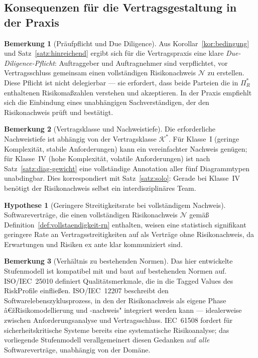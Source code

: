 ﻿\documentclass[a4paper,12pt]{article}
\theoremstyle{definition}
\newtheorem{bemerkung}{Bemerkung}
\newtheorem{hypothese}{Hypothese}
\begin{document}
\subsection{Konsequenzen f\"ur die Vertragsgestaltung in der Praxis}

\begin{bemerkung}[Pr\"aufpflicht und Due Diligence]
    Aus Korollar~\ref{kor:bedingung} und Satz~\ref{satz:hinreichend} ergibt sich f\"ur
    die Vertragspraxis eine klare \emph{Due-Diligence-Pflicht}: Auftraggeber und
    Auftragnehmer sind verpflichtet, vor Vertragsschluss gemeinsam einen vollst\"andigen
    Risikonachweis $\mathcal{N}$ zu erstellen. Diese Pflicht ist nicht delegierbar ---
    sie erfordert, dass beide Parteien die in $\Pi_R^*$ enthaltenen Risikoma\ss{}zahlen
    verstehen und akzeptieren. In der Praxis empfiehlt sich die Einbindung eines
    unabh\"angigen Sachverst\"andigen, der den Risikonachweis pr\"uft und best\"atigt.
\end{bemerkung}

\begin{bemerkung}[Vertragsklasse und Nachweistiefe]
    Die erforderliche Nachweistiefe ist abh\"angig von der Vertragsklasse
    $\mathcal{K}^*$. F\"ur Klasse~I (geringe Komplexit\"at, stabile Anforderungen)
    kann ein vereinfachter Nachweis gen\"ugen; f\"ur Klasse~IV (hohe Komplexit\"at,
    volatile Anforderungen) ist nach Satz~\ref{satz:diag-gewicht} eine vollst\"andige
    Annotation aller f\"unf Diagrammtypen unabdingbar. Dies korrespondiert mit
    Satz~\ref{satz:solo}: Gerade bei Klasse~IV ben\"otigt der Risikonachweis selbst
    ein interdisziplin\"ares Team.
\end{bemerkung}

\begin{hypothese}[Geringere Streitigkeitsrate bei vollst\"andigem Nachweis]
\label{hyp:streit}
    Softwarevertr\"age, die einen vollst\"andigen Risikonachweis $\mathcal{N}$
    gem\"a\ss{} Definition~\ref{def:vollstaendigkeit-rn} enthalten, weisen eine
    statistisch signifikant geringere Rate an Vertragsstreitigkeiten auf als Vertr\"age
    ohne Risikonachweis, da Erwartungen und Risiken ex ante klar kommuniziert sind.
\end{hypothese}

\begin{bemerkung}[Verhältnis zu bestehenden Normen]
    Das hier entwickelte Stufenmodell ist kompatibel mit und baut auf bestehenden
    Normen auf. ISO/IEC~25010 definiert Qualit\"atsmerkmale, die in die Tagged Values
    des \textsf{RiskProfile} einflie\ss{}en. ISO/IEC~12207 beschreibt den
    Softwarelebenszyklusprozess, in den der Risikonachweis als eigene Phase
    â€žRisikomodellierung und -nachweis" integriert werden kann --- idealerweise zwischen
    Anforderungsanalyse und Vertragsschluss. IEC~61508 fordert f\"ur sicherheitskritische
    Systeme bereits eine systematische Risikoanalyse; das vorliegende Stufenmodell
    verallgemeinert diesen Gedanken auf \emph{alle} Softwarevertr\"age, unabh\"angig
    von der Dom\"ane.
\end{bemerkung}
\end{document}

